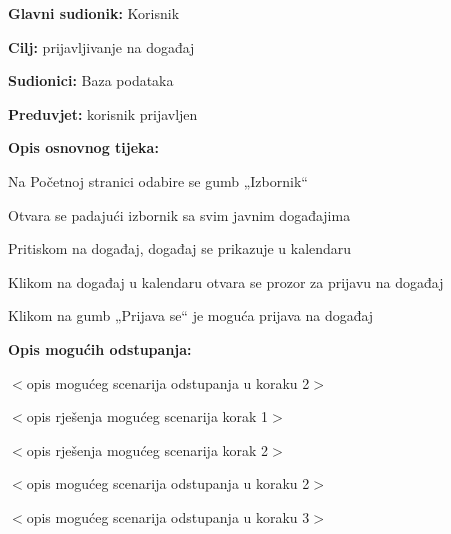 	\noindent {}
\begin{packed_item}
	
	\item \textbf{Glavni sudionik: }Korisnik
	\item  \textbf{Cilj:} prijavljivanje na događaj
	\item  \textbf{Sudionici:}
	Baza podataka
	\item  \textbf{Preduvjet:} korisnik prijavljen
	\item  \textbf{Opis osnovnog tijeka:}
	
	\item[] \begin{packed_enum}
		
		\item	Na Početnoj stranici odabire se gumb „Izbornik“ 
		\item	Otvara se padajući izbornik sa svim javnim događajima
		\item	Pritiskom na događaj, događaj se prikazuje u kalendaru
		\item	Klikom na događaj u kalendaru otvara se prozor za prijavu na događaj
		\item	Klikom na gumb „Prijava se“  je moguća prijava na događaj
		
	\end{packed_enum}
	
	\item  \textbf{Opis mogućih odstupanja:}
	
	\item[] \begin{packed_item}
		
		\item[2.a] $<$opis mogućeg scenarija odstupanja u koraku 2$>$
		\item[] \begin{packed_enum}
			
			\item $<$opis rješenja mogućeg scenarija korak 1$>$
			\item $<$opis rješenja mogućeg scenarija korak 2$>$
			
		\end{packed_enum}
		\item[2.b] $<$opis mogućeg scenarija odstupanja u koraku 2$>$
		\item[3.a] $<$opis mogućeg scenarija odstupanja  u koraku 3$>$
		
	\end{packed_item}
\end{packed_item}

